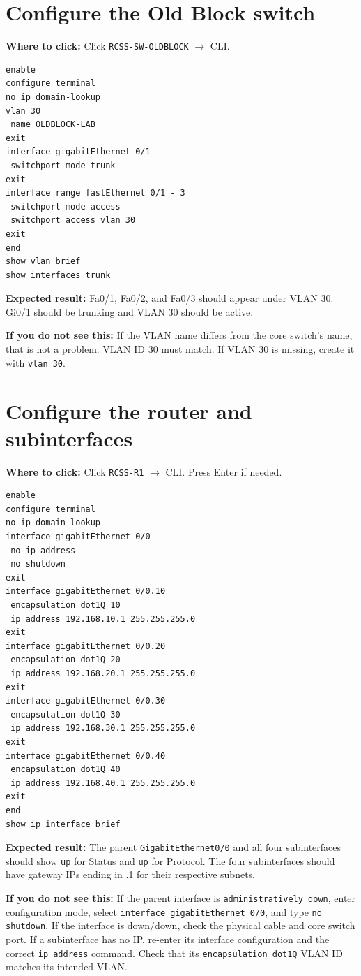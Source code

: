 \documentclass[11pt,a4paper]{article}
\newcommand{\clickpath}[1]{\noindent\colorbox{noteBG}{\parbox{0.96\linewidth}{\textbf{Where to click:} #1}}\par\vspace{5pt}}
\newcommand{\expected}[1]{\noindent\colorbox{noteBG}{\parbox{0.96\linewidth}{\textbf{Expected result:} #1}}\par\vspace{5pt}}
\newcommand{\ifnot}[1]{\noindent\colorbox{warnBG}{\parbox{0.96\linewidth}{\textbf{If you do not see this:} #1}}\par\vspace{5pt}}
\begin{document}
\section{Configure the Old Block switch}\label{sec:oldblock}
\clickpath{Click \texttt{RCSS-SW-OLDBLOCK} \(\rightarrow\) CLI.}
\begin{lstlisting}
enable
configure terminal
no ip domain-lookup
vlan 30
 name OLDBLOCK-LAB
exit
interface gigabitEthernet 0/1
 switchport mode trunk
exit
interface range fastEthernet 0/1 - 3
 switchport mode access
 switchport access vlan 30
exit
end
show vlan brief
show interfaces trunk
\end{lstlisting}
\expected{Fa0/1, Fa0/2, and Fa0/3 should appear under VLAN 30. Gi0/1 should be trunking and VLAN 30 should be active.}
\ifnot{If the VLAN name differs from the core switch's name, that is not a problem. VLAN ID 30 must match. If VLAN 30 is missing, create it with \texttt{vlan 30}.}

\section{Configure the router and subinterfaces}\label{sec:router}
\clickpath{Click \texttt{RCSS-R1} \(\rightarrow\) CLI. Press Enter if needed.}
\begin{lstlisting}
enable
configure terminal
no ip domain-lookup
interface gigabitEthernet 0/0
 no ip address
 no shutdown
exit
interface gigabitEthernet 0/0.10
 encapsulation dot1Q 10
 ip address 192.168.10.1 255.255.255.0
exit
interface gigabitEthernet 0/0.20
 encapsulation dot1Q 20
 ip address 192.168.20.1 255.255.255.0
exit
interface gigabitEthernet 0/0.30
 encapsulation dot1Q 30
 ip address 192.168.30.1 255.255.255.0
exit
interface gigabitEthernet 0/0.40
 encapsulation dot1Q 40
 ip address 192.168.40.1 255.255.255.0
exit
end
show ip interface brief
\end{lstlisting}

\expected{The parent \texttt{GigabitEthernet0/0} and all four subinterfaces should show \texttt{up} for Status and \texttt{up} for Protocol. The four subinterfaces should have gateway IPs ending in .1 for their respective subnets.}
\ifnot{If the parent interface is \texttt{administratively down}, enter configuration mode, select \texttt{interface gigabitEthernet 0/0}, and type \texttt{no shutdown}. If the interface is down/down, check the physical cable and core switch port. If a subinterface has no IP, re-enter its interface configuration and the correct \texttt{ip address} command. Check that its \texttt{encapsulation dot1Q} VLAN ID matches its intended VLAN.}
\end{document}
